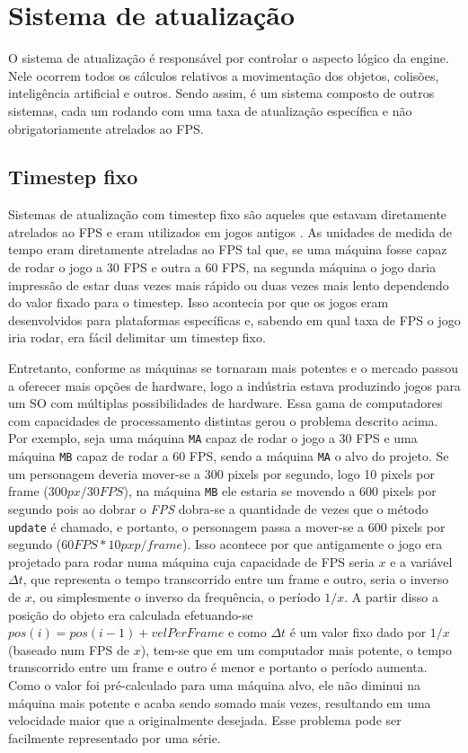\documentclass[12pt, 
openright, 
oneside, 
a4paper,    
brazil]{facom-ufu-abntex2}
\begin{document}
\section{Sistema de atualização}
O sistema de atualização é responsável por controlar o aspecto lógico da engine. Nele ocorrem todos os cálculos relativos a movimentação dos objetos, colisões, inteligência artificial e outros. Sendo assim, é um sistema composto de outros sistemas, cada um rodando com uma taxa de atualização específica e não obrigatoriamente atrelados ao FPS.

\subsection{Timestep fixo}
Sistemas de atualização com timestep fixo são aqueles que estavam diretamente atrelados ao FPS e eram utilizados em jogos antigos \cite{GameEngineArchitecture}. As unidades de medida de tempo eram diretamente atreladas ao FPS tal que, se uma máquina fosse capaz de rodar o jogo a 30 FPS e outra a 60 FPS, na segunda máquina o jogo daria impressão de estar duas vezes mais rápido ou duas vezes mais lento dependendo do valor fixado para o timestep. Isso acontecia por que os jogos eram desenvolvidos para plataformas específicas e, sabendo em qual taxa de FPS o jogo iria rodar, era fácil delimitar um timestep fixo.

Entretanto, conforme as máquinas se tornaram mais potentes e o mercado passou a oferecer mais opções de hardware, logo a indústria estava produzindo jogos para um SO com múltiplas possibilidades de hardware. Essa gama de computadores com capacidades de processamento distintas gerou o problema descrito acima. Por exemplo, seja uma máquina \texttt{MA} capaz de rodar o jogo a 30 FPS e uma máquina \texttt{MB} capaz de rodar a 60 FPS, sendo a máquina \texttt{MA} o alvo do projeto. Se um personagem deveria mover-se a  300 pixels por segundo, logo 10 pixels por frame ($300 px/ 30 FPS$), na máquina \texttt{MB} ele estaria se movendo a 600 pixels por segundo pois ao dobrar o \textit{FPS} dobra-se a quantidade de vezes que o método \texttt{update} é chamado, e portanto, o personagem passa a mover-se a 600 pixels por segundo ($60 FPS * 10 px p/ frame$). Isso acontece por que antigamente o jogo era projetado para rodar numa máquina cuja capacidade de FPS seria $x$ e a variável $\Delta t$, que representa o tempo transcorrido entre um frame e outro, seria o inverso de $x$, ou simplesmente o inverso da frequência, o período $1/x$. A partir disso a posição do objeto era calculada efetuando-se $pos(i) = pos(i-1) + velPerFrame$ e como $\Delta t$ é um valor fixo dado por $1/x$ (baseado num FPS de $x$), tem-se que em um computador mais potente, o tempo transcorrido entre um frame e outro é menor e portanto o período aumenta. Como o valor foi pré-calculado para uma máquina alvo, ele não diminui na máquina mais potente e acaba sendo somado mais vezes, resultando em uma velocidade maior que a originalmente desejada. Esse problema pode ser facilmente representado por uma série.
\end{document}

